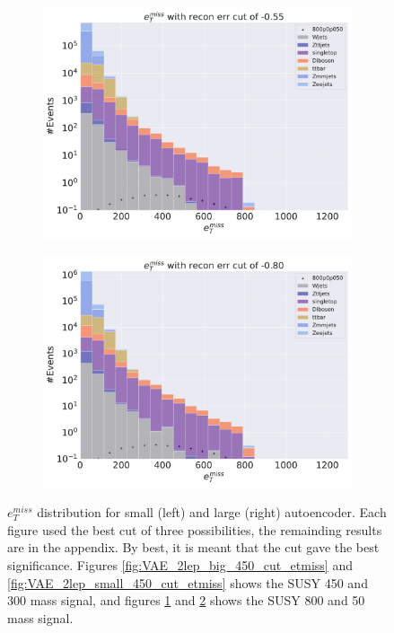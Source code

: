 \begin{figure}[H]
    \hfill
    \begin{subfigure}{.45\textwidth}
        \includegraphics[width=\textwidth]{Figures/VAE_testing/big/2lep/b_data_recon_big_rm3_feats_sig_800p0p050_recon_errcut_-0.55.pdf}
        \caption{}
        \label{fig:VAE_2lep_big_800_cut_etmiss}
    \end{subfigure}
    \hfill   
    \begin{subfigure}{.45\textwidth}
        \includegraphics[width=\textwidth]{Figures/VAE_testing/small/2lep/b_data_recon_big_rm3_feats_sig_800p0p050_recon_errcut_-0.80.pdf}
        \caption{}
        \label{fig:VAE_2lep_small_800_cut_etmiss}
    \end{subfigure}
    \hfill      
    \caption[$e_T^{miss}$ best cuts for regular autoencoder]{$e_T^{miss}$ distribution for small (left) and large (right) autoencoder.
    Each figure used the best cut of three possibilities, the remainding results are in the appendix. By best, it is meant that the cut
    gave the best significance. Figures \ref{fig:VAE_2lep_big_450_cut_etmiss} and \ref{fig:VAE_2lep_small_450_cut_etmiss} shows the SUSY 450 and 300 mass signal, 
    and figures \ref{fig:VAE_2lep_big_800_cut_etmiss} and \ref{fig:VAE_2lep_small_800_cut_etmiss} shows the SUSY 800 and 50 mass signal.}
    \label{fig:VAE_2lep_recon_err_both_sig_cut_etmiss}
\end{figure}



